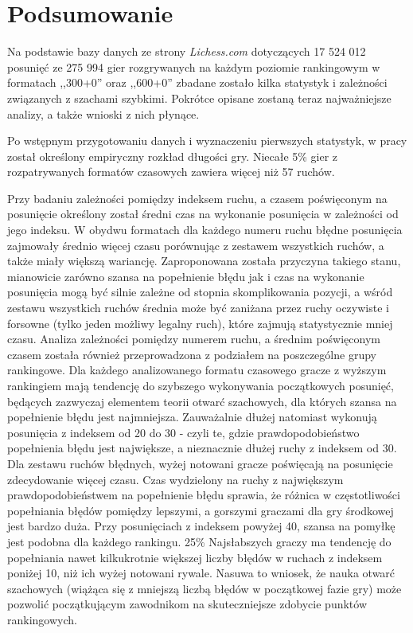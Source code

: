 \documentclass[inzynierska]{pwr_wmat_praca_dyplomowa}
\theoremstyle{plain}
\numberwithin{theorem}{chapter}
\theoremstyle{definition}
\numberwithin{theorem}{chapter}
\begin{document}
\chapter{Podsumowanie}
Na podstawie bazy danych ze strony \textit{Lichess.com} dotyczących 17 524 012 posunięć ze 275 994 gier rozgrywanych na każdym poziomie rankingowym w formatach ,,300+0'' oraz ,,600+0'' zbadane zostało kilka statystyk i zależności związanych z szachami szybkimi. Pokrótce opisane zostaną teraz najważniejsze analizy, a także wnioski z nich płynące.

Po wstępnym przygotowaniu danych i wyznaczeniu pierwszych statystyk, w pracy został określony empiryczny rozkład długości gry. Niecałe 5\% gier z rozpatrywanych formatów czasowych zawiera więcej niż 57 ruchów. 

Przy badaniu zależności pomiędzy indeksem ruchu, a czasem poświęconym na posunięcie określony został średni czas na wykonanie posunięcia w zależności od jego indeksu. W obydwu formatach dla każdego numeru ruchu błędne posunięcia zajmowały średnio więcej czasu porównując z zestawem wszystkich ruchów, a także miały większą wariancję.
Zaproponowana została przyczyna takiego stanu, mianowicie zarówno szansa na popełnienie błędu jak i czas na wykonanie posunięcia mogą być silnie zależne od stopnia skomplikowania pozycji, a wśród zestawu wszystkich ruchów średnia może być zaniżana przez ruchy oczywiste i forsowne (tylko jeden możliwy legalny ruch), które zajmują statystycznie mniej czasu.
Analiza zależności pomiędzy numerem ruchu, a średnim poświęconym czasem została również przeprowadzona z podziałem na poszczególne grupy rankingowe. Dla każdego analizowanego formatu czasowego gracze z wyższym rankingiem mają tendencję do szybszego wykonywania początkowych posunięć, będących zazwyczaj elementem teorii otwarć szachowych, dla których szansa na popełnienie błędu jest najmniejsza. Zauważalnie dłużej natomiast wykonują posunięcia z indeksem od 20 do 30 - czyli te, gdzie prawdopodobieństwo popełnienia błędu jest największe, a nieznacznie dłużej ruchy z indeksem od 30. Dla zestawu ruchów błędnych, wyżej notowani gracze poświęcają na posunięcie zdecydowanie więcej czasu. Czas wydzielony na ruchy z największym prawdopodobieństwem na popełnienie błędu sprawia, że różnica w częstotliwości popełniania błędów pomiędzy lepszymi, a gorszymi graczami dla gry środkowej jest bardzo duża. Przy posunięciach z indeksem powyżej 40, szansa na pomyłkę jest podobna dla każdego rankingu. 25\% Najsłabszych graczy ma tendencję do popełniania nawet kilkukrotnie większej liczby błędów w ruchach z indeksem poniżej 10, niż ich wyżej notowani rywale. Nasuwa to wniosek, że nauka otwarć szachowych (wiążąca się z mniejszą liczbą błędów w początkowej fazie gry) może pozwolić początkującym zawodnikom na skuteczniejsze zdobycie punktów rankingowych.
\end{document}
